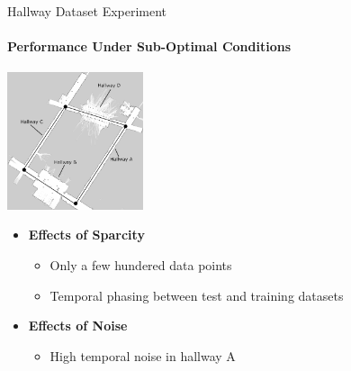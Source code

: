 \documentclass{beamer}
\begin{document}
\begin{frame}[t]{Hallway Dataset Experiment}
  \framesubtitle{Performance Under Sub-Optimal Conditions}

  \centering
  \includegraphics[width=4.0cm]{images/ROPOD_nodes.png}

  \begin{itemize}
    \setlength\itemsep{1em}
  \item \textbf{Effects of Sparcity}
    \begin{itemize}
      \item Only a few hundered data points
      \item Temporal phasing between test and training datasets
    \end{itemize}
  \item \textbf{Effects of Noise}
    \begin{itemize}
      \item High temporal noise in hallway A
    \end{itemize}
  \end{itemize}
\end{frame}
\end{document}
